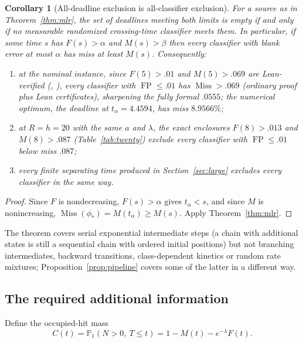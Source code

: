 \documentclass[11pt,a4paper]{article}
\theoremstyle{plain}
\newtheorem{corollary}[theorem]{Corollary}
\theoremstyle{definition}
\theoremstyle{remark}
\newcommand{\Prob}{\mathbb P}
\newcommand{\FP}{\operatorname{FP}}
\newcommand{\Miss}{\operatorname{Miss}}
\begin{document}
\begin{corollary}[All-deadline exclusion is all-classifier exclusion]\label{cor:sharp}
For a source as in Theorem~\ref{thm:mlr}, the set of deadlines meeting both limits is empty if and only if no measurable randomized crossing-time classifier meets them. In particular, if some time $s$ has $F(s)>\alpha$ and $M(s)>\beta$ then every classifier with blank error at most $\alpha$ has miss at least $M(s)$. Consequently:
\begin{enumerate}[label=(\alph*)]
\item at the nominal instance, since $F(5)>.01$ and $M(5)>.069$ are Lean-verified (, ), every classifier with $\FP\le.01$ has $\Miss>.069$ (ordinary proof plus Lean certificates), sharpening the fully formal $.0555$; the numerical optimum, the deadline at $t_\alpha=4.4594$, has miss $8.9566\%$;
\item at $R=h=20$ with the same $a$ and $\lambda$, the exact enclosures $F(8)>.013$ and $M(8)>.087$ (Table~\ref{tab:twenty}) exclude every classifier with $\FP\le.01$ below miss $.087$;
\item every finite separating time produced in Section~\ref{sec:large} excludes every classifier in the same way.
\end{enumerate}
\end{corollary}
\begin{proof}
Since $F$ is nondecreasing, $F(s)>\alpha$ gives $t_\alpha<s$, and since $M$ is nonincreasing, $\Miss(\phi_*)=M(t_\alpha)\ge M(s)$. Apply Theorem~\ref{thm:mlr}.
\end{proof}
The theorem covers serial exponential intermediate steps (a chain with additional states is still a sequential chain with ordered initial positions) but not branching intermediates, backward transitions, class-dependent kinetics or random rate mixtures; Proposition~\ref{prop:pipeline} covers some of the latter in a different way.

\subsection{The required additional information}\label{sec:channel}
Define the occupied-hit mass
\begin{equation}\label{eq:C}
C(t)=\Prob_1(N>0,\ T\le t)=1-M(t)-e^{-\lambda}F(t).
\end{equation}
\end{document}
